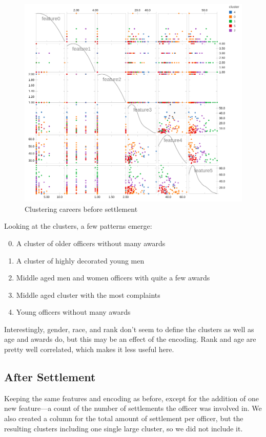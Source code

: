 \documentclass{article}
\begin{document}
\begin{figure}[h!]
\centering
\caption{Clustering careers before settlement}
\includegraphics[width=\textwidth]{cluster.png}
\end{figure}
Looking at the clusters, a few patterns emerge:
\begin{enumerate}
\setcounter{enumi}{-1}
\item{A cluster of older officers without many awards}
\item{A cluster of highly decorated young men}
\item{Middle aged men and women officers with quite a few awards}
\item{Middle aged cluster with the most complaints}
\item{Young officers without many awards}
\end{enumerate}
Interestingly, gender, race, and rank don't seem to define the clusters as well as age and awards do, but this may be an effect of the encoding. Rank and age are pretty well correlated, which makes it less useful here.

\FloatBarrier


\subsection{After Settlement}
Keeping the same features and encoding as before, except for the addition of one new feature---a count of the number of settlements the officer was involved in. We also created a column for the total amount of settlement per officer, but the resulting clusters including one single large cluster, so we did not include it.
\end{document}
